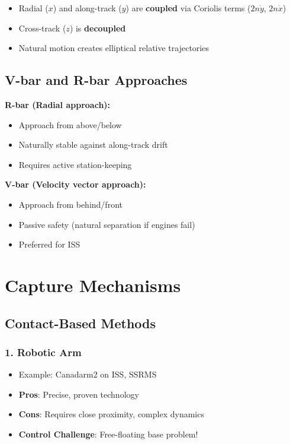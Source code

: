 \documentclass[11pt,a4paper]{article}
\begin{document}
\begin{tcolorbox}[colback=blue!5!white,colframe=codeborder,title=Key Insight]
\begin{itemize}[leftmargin=*]
    \item Radial ($x$) and along-track ($y$) are \textbf{coupled} via Coriolis terms ($2n\dot{y}$, $2n\dot{x}$)
    \item Cross-track ($z$) is \textbf{decoupled}
    \item Natural motion creates elliptical relative trajectories
\end{itemize}
\end{tcolorbox}

\subsection{V-bar and R-bar Approaches}

\textbf{R-bar (Radial approach):}
\begin{itemize}[leftmargin=*]
    \item Approach from above/below
    \item Naturally stable against along-track drift
    \item Requires active station-keeping
\end{itemize}

\textbf{V-bar (Velocity vector approach):}
\begin{itemize}[leftmargin=*]
    \item Approach from behind/front
    \item Passive safety (natural separation if engines fail)
    \item Preferred for ISS
\end{itemize}

\section{Capture Mechanisms}

\subsection{Contact-Based Methods}

\subsubsection{1. Robotic Arm}
\begin{itemize}[leftmargin=*]
    \item Example: Canadarm2 on ISS, SSRMS
    \item \textbf{Pros}: Precise, proven technology
    \item \textbf{Cons}: Requires close proximity, complex dynamics
    \item \textbf{Control Challenge}: Free-floating base problem!
\end{itemize}
\end{document}
